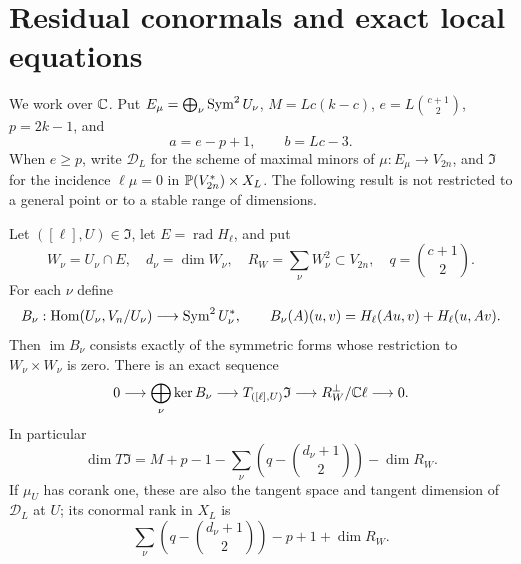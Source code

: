 \section{Residual conormals and exact local equations}\label{sec:residual-calculus}
We work over $\mathbb C$. Put $E_\mu=\bigoplus_\nu\operatorname{Sym}^2U_\nu$,
$M=Lc(k-c)$, $e=L\binom{c+1}{2}$, $p=2k-1$, and
\[
 a=e-p+1,\qquad b=Lc-3.
\]
When $e\ge p$, write $\mathscr D_L$ for the scheme of maximal minors of
$\mu:E_\mu\longrightarrow V_{2n}$, and $\mathfrak I$ for the incidence
$\ell\mu=0$ in $\mathbb P(V_{2n}^*)\times X_L$.
The following result is not restricted to a general point or to a stable
range of dimensions.

\begin{theorem}\label{thm:residual-tangent}
Let $([\ell],U)\in\mathfrak I$, let $E=\operatorname{rad}H_\ell$, and put
\[
 W_\nu=U_\nu\cap E,\quad d_\nu=\dim W_\nu,\quad
 R_W=\sum_\nu W_\nu^2\subset V_{2n},\quad
 q=\binom{c+1}{2}.
\]
For each $\nu$ define
\[
 B_\nu:\operatorname{Hom}(U_\nu,V_n/U_\nu)\longrightarrow\operatorname{Sym}^2U_\nu^*,
 \qquad B_\nu(A)(u,v)=H_\ell(Au,v)+H_\ell(u,Av).
\]
Then $\operatorname{im}B_\nu$ consists exactly of the symmetric forms
whose restriction to $W_\nu\times W_\nu$ is zero. There is an exact sequence
\begin{equation}\label{eq:residual-tangent-sequence}
 0\longrightarrow\bigoplus_\nu\ker B_\nu
 \longrightarrow T_{([\ell],U)}\mathfrak I
 \longrightarrow R_W^\perp/\mathbb C\ell\longrightarrow0.
\end{equation}
In particular
\begin{equation}\label{eq:residual-tangent-dimension}
 \dim T\mathfrak I
 =M+p-1-\sum_\nu\left(q-\binom{d_\nu+1}{2}\right)-\dim R_W.
\end{equation}
If $\mu_U$ has corank one, these are also the tangent space and tangent
dimension of $\mathscr D_L$ at $U$; its conormal rank in $X_L$ is
\begin{equation}\label{eq:residual-conormal-rank}
 \sum_\nu\left(q-\binom{d_\nu+1}{2}\right)-p+1+\dim R_W.
\end{equation}
\end{theorem}
